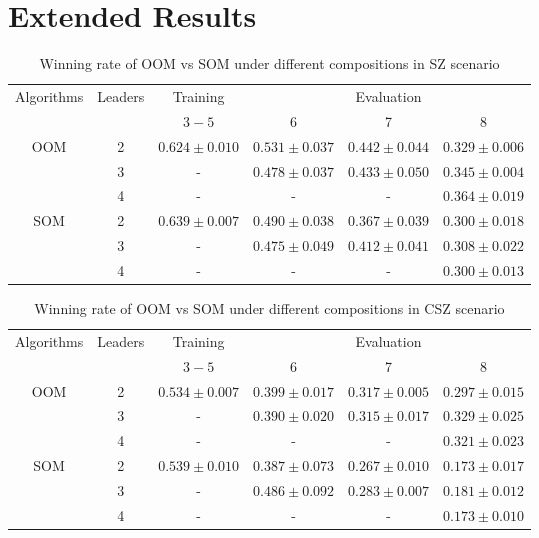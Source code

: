 \documentclass[10pt]{article} %
\begin{document}
\section{Extended Results}

\begin{table}[ht]
\caption{Winning rate of OOM vs SOM under different compositions in SZ scenario}
  \label{table-results-extended_sz}
  \centering
\renewcommand{\arraystretch}{1.2} %
\begin{tabular}{cccccc}
\hline \multirow{2}{*}{ Algorithms } & \multirow{2}{*}{ Leaders } & Training & \multicolumn{3}{c}{ Evaluation } \\
\cline { 4 - 6 } & & $3-5$ & 6 & 7 & 8 \\
 \hline \multirow{3}{*}{OOM} & 2 & $0.624 \pm 0.010$ & $\mathbf{0.531} \pm 0.037$ & $\mathbf{0.442} \pm 0.044$ & $0.329 \pm 0.006$ \\
 \cline { 2 - 6 } & 3 & -  & $0.478 \pm 0.037$ & $0.433 \pm 0.050$ & $0.345 \pm 0.004$ \\
  \cline { 2 - 6 } & 4 & -  & - & - & $\mathbf{0.364} \pm 0.019$ \\
\hline
\multirow{3}{*}{SOM} & 2 & $\mathbf{0.639} \pm 0.007$ & $0.490 \pm 0.038$ & $0.367 \pm 0.039$ & $0.300 \pm 0.018$ \\
 \cline { 2 - 6 } & 3 & -  & $0.475 \pm 0.049$ & $0.412 \pm 0.041$ & $0.308 \pm 0.022$ \\
  \cline { 2 - 6 } & 4 & -  & - & - & $0.300 \pm 0.013$ \\
\end{tabular}
\end{table}

\begin{table}[ht]
\caption{Winning rate of OOM vs SOM under different compositions in CSZ scenario}
  \label{table-results-extended_csz}
  \centering
\renewcommand{\arraystretch}{1.2} %
\begin{tabular}{cccccc}
\hline \multirow{2}{*}{ Algorithms } & \multirow{2}{*}{ Leaders } & Training & \multicolumn{3}{c}{ Evaluation } \\
\cline { 4 - 6 } & & $3-5$ & 6 & 7 & 8 \\
 \hline \multirow{3}{*}{OOM} & 2 & $0.534 \pm 0.007$ & $0.399 \pm 0.017$ & $\mathbf{0.317} \pm 0.005$ & $0.297 \pm 0.015$ \\
 \cline { 2 - 6 } & 3 & -  & $0.390 \pm 0.020$ & $0.315 \pm 0.017$ & $\mathbf{0.329} \pm 0.025$ \\
  \cline { 2 - 6 } & 4 & -  & - & - & $0.321 \pm 0.023$ \\
\hline
\multirow{3}{*}{SOM} & 2 & $\mathbf{0.539} \pm 0.010$ & $0.387 \pm 0.073$ & $0.267 \pm 0.010$ & $0.173 \pm 0.017$ \\
 \cline { 2 - 6 } & 3 & -  & $\mathbf{0.486} \pm 0.092$ & $0.283 \pm 0.007$ & $0.181 \pm 0.012$ \\
  \cline { 2 - 6 } & 4 & -  & - & - & $0.173 \pm 0.010$ \\
\end{tabular}
\end{table}
\end{document}
